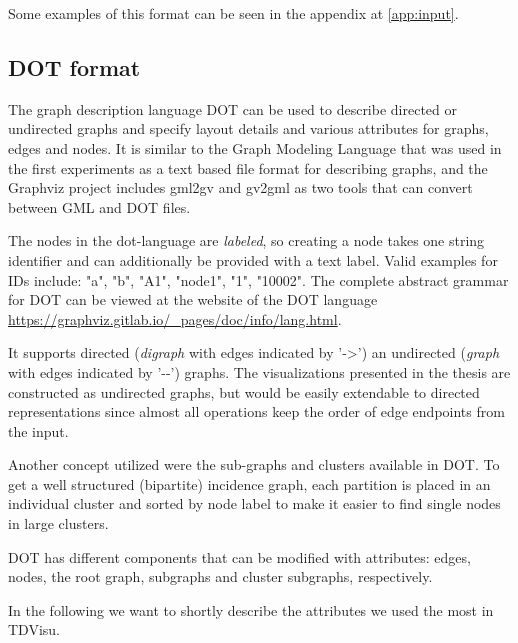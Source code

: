 \documentclass[a4paper, 12pt, bibliography=totoc]{scrartcl}
\begin{document}

Some examples of this format can be seen in the appendix at \ref{app:input}.

\subsection{DOT format}
The graph description language DOT can be used to describe directed or undirected graphs and specify layout details and various attributes for graphs, edges and nodes. It is similar to the Graph Modeling Language that was used in the first experiments as a text based file format for describing graphs, and the Graphviz project includes gml2gv and gv2gml as two tools that can convert between GML and DOT files.



The nodes in the dot-language are \emph{labeled}, so creating a node takes one string identifier and can additionally be provided with a text label. Valid examples for IDs include: "a", "b", "A1", "node1", "1", "10002".
The complete abstract grammar for DOT can be viewed at the website of the DOT language \url{https://graphviz.gitlab.io/_pages/doc/info/lang.html}.

It supports directed (\textit{digraph} with edges indicated by '->') an undirected (\textit{graph} with edges indicated by '-{}-') graphs.
The visualizations presented in the thesis are constructed as undirected graphs, but would be easily extendable to directed representations since almost all operations keep the order of edge endpoints from the input.

Another concept utilized were the sub-graphs and clusters available in DOT.
To get a well structured (bipartite) incidence graph, each partition is placed in an individual cluster and sorted by node label to make it easier to find single nodes in large clusters.

DOT has different components that can be modified with attributes: edges, nodes, the root graph, subgraphs and cluster subgraphs, respectively.

In the following we want to shortly describe the attributes we used the most in TDVisu.
\end{document}
